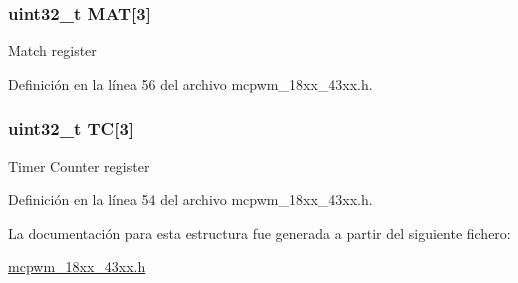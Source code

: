 \subsubsection[{\texorpdfstring{M\+AT}{MAT}}]{ uint32\+\_\+t M\+AT\mbox{[}3\mbox{]}}\hypertarget{struct_l_p_c___m_c_p_w_m___t_a0b2328ce6f9595dfade639d1b4206835}{}\label{struct_l_p_c___m_c_p_w_m___t_a0b2328ce6f9595dfade639d1b4206835}
Match register 

Definición en la línea 56 del archivo mcpwm\+\_\+18xx\+\_\+43xx.\+h.

\subsubsection[{\texorpdfstring{TC}{TC}}]{ uint32\+\_\+t TC\mbox{[}3\mbox{]}}\hypertarget{struct_l_p_c___m_c_p_w_m___t_ab62d46ad00d1b422321e6d9e247ad797}{}\label{struct_l_p_c___m_c_p_w_m___t_ab62d46ad00d1b422321e6d9e247ad797}
Timer Counter register 

Definición en la línea 54 del archivo mcpwm\+\_\+18xx\+\_\+43xx.\+h.



La documentación para esta estructura fue generada a partir del siguiente fichero\+:\begin{DoxyCompactItemize}
\item 
\hyperlink{mcpwm__18xx__43xx_8h}{mcpwm\+\_\+18xx\+\_\+43xx.\+h}\end{DoxyCompactItemize}
